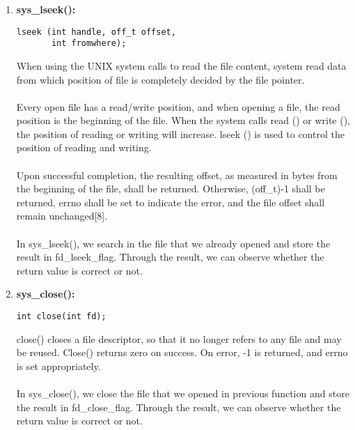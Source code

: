 \documentclass[twoside]{article}
\begin{document}
\begin{multicols}{2}
\begin{enumerate}
\item
{\bf sys\_lseek():}
{\footnotesize
\begin{lstlisting}
lseek (int handle, off_t offset,
       int fromwhere);
\end{lstlisting}
\par}

\noindent
When using the UNIX system calls to read the file content, system read data from which position of file is completely decided by the file pointer. 
\\\\
\noindent
Every open file has a read/write position, and when opening a file, the read position is the beginning of the file. When the system calls read () or write (), the position of reading or writing will increase. lseek () is used to control the position of reading and writing.
\\\\
\noindent
Upon successful completion, the resulting offset, as measured in bytes from the beginning of the file, shall be returned. Otherwise, (off\_t)-1 shall be returned, errno shall be set to indicate the error, and the file offset shall remain unchanged[8].
\\\\
\noindent
In sys\_lseek(), we search in the file that we already opened and store the result in fd\_lseek\_flag. Through the result, we can observe whether the return value is correct or not.

\item
{\bf sys\_close():}
{\footnotesize
\begin{lstlisting}
int close(int fd);
\end{lstlisting}
\par}
close() closes a file descriptor, so that it no longer refers to any file and may be reused. Close() returns zero on success. On error, -1 is returned, and errno is set appropriately. 
\\\\
\noindent
In sys\_close(), we close the file that we opened in previous function and store the result in fd\_close\_flag. Through the result, we can observe whether the return value is correct or not.



\end{enumerate}
\end{multicols}
\end{document}
